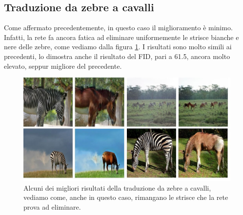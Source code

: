 \subsection{Traduzione da zebre a cavalli}
Come affermato precedentemente, in questo caso il miglioramento è minimo. Infatti, la rete fa ancora fatica ad eliminare uniformemente le strisce bianche e nere delle zebre, come vediamo dalla figura \ref{fig:Risultati cavalli GradCam}. I risultati sono molto simili ai precedenti, lo dimostra anche il risultato del FID, pari a 61.5, ancora molto elevato, seppur migliore del precedente.
\begin{figure}[H]
\begin{center}
\includegraphics[width=1\columnwidth]{images/image (2).jpeg} 
\end{center}
\caption{Alcuni dei migliori risultati della traduzione da zebre a cavalli, vediamo come, anche in questo caso, rimangano le strisce che la rete prova ad eliminare.}
\label{fig:Risultati cavalli GradCam}
\end{figure} 

